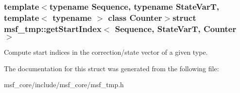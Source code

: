 \subsubsection*{template$<$typename Sequence, typename State\-Var\-T, template$<$ typename $>$ class Counter$>$struct msf\-\_\-tmp\-::get\-Start\-Index$<$ Sequence, State\-Var\-T, Counter $>$}

Compute start indices in the correction/state vector of a given type. 

The documentation for this struct was generated from the following file\-:\begin{DoxyCompactItemize}
\item 
msf\-\_\-core/include/msf\-\_\-core/msf\-\_\-tmp.\-h\end{DoxyCompactItemize}

